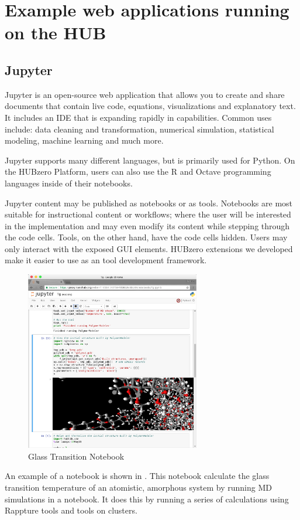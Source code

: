 \documentclass[conference]{../sty/IEEEtran}
\begin{document}
\section {Example web applications running on the HUB}

\subsection {Jupyter}

Jupyter is an open-source web application that allows you to create and share
documents that contain live code, equations, visualizations and explanatory
text. It includes an IDE that is expanding rapidly in capabilities. Common uses
include: data cleaning and transformation, numerical simulation, statistical
modeling, machine learning and much more.

Jupyter supports many different languages, but is primarily used for Python.
On the HUBzero Platform, users can also use the R and Octave programming
languages inside of their notebooks.

Jupyter content may be published as notebooks or as tools.  Notebooks are most
suitable for instructional content or workflows; where the user will be
interested in the implementation and may even modify its content while stepping
through the code cells.  Tools, on the other hand, have the code cells hidden.
Users may only interact with the exposed GUI elements. HUBzero extensions we
developed make it easier to use as an tool development framework.


\begin{figure}[!h]
	\includegraphics[width=3in]{tgnb}
	\caption{Glass Transition Notebook \cite{tg}}
	\label{fig_tg}
\end{figure}

An example of a notebook is shown in .  This notebook calculate
the glass transition temperature of an atomistic, amorphous system by running
MD simulations in a notebook.  It does this by running a series of calculations
using Rappture tools and tools on clusters.
\end{document}
